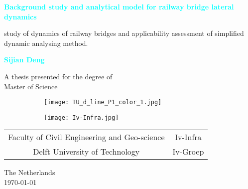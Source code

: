 
\begin{titlepage}
    \begin{center}
        \vspace*{1cm}
        
        \textbf{\textcolor{cyan}{Background study and analytical model for railway bridge lateral dynamics}}
        
        \vspace{0.5cm}
        study of dynamics of railway bridges and applicability assessment of simplified dynamic analysing method.
        
        \vspace{1.5cm}
        
        \textbf{\textcolor{cyan}{Sijian Deng}}
        
        \vfill
        
        A thesis presented for the degree of\\
        Master of Science
        
        \vspace{0.8cm}
        
        

        \begin{figure}[h]
        \centering
        \begin{subfigure}[b]{0.3\textwidth}
                \texttt{[image: TU\_d\_line\_P1\_color\_1.jpg]}
        \end{subfigure}
        \begin{subfigure}[b]{0.3\textwidth}
                \texttt{[image: Iv-Infra.jpg]}
        \end{subfigure}
        \end{figure}

        \begin{tabular} {cc}
        Faculty of Civil Engineering and Geo-science & Iv-Infra \\
        Delft University of Technology & Iv-Groep\\

        \end{tabular}

        The Netherlands \\
        \today
        
    \end{center}
\end{titlepage}